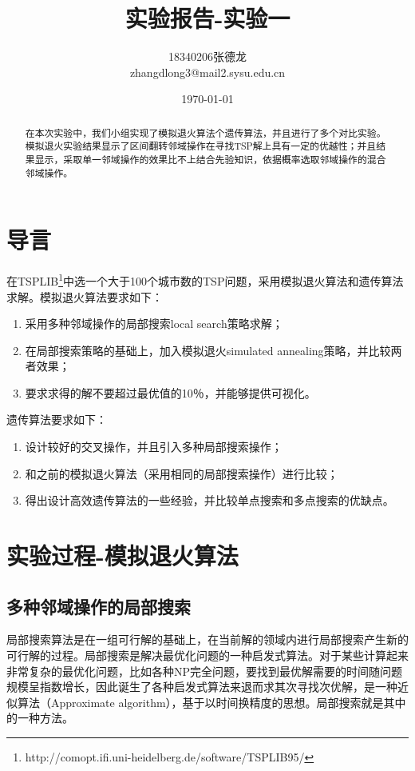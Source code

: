 \documentclass[withoutpreface,bwprint]{cumcmthesis} %
\title{实验报告-实验一}
\author{18340206张德龙 \\
	zhangdlong3@mail2.sysu.edu.cn
}
\date{\today}
\begin{document}
\maketitle
\begin{abstract}
 
 在本次实验中，我们小组实现了模拟退火算法个遗传算法，并且进行了多个对比实验。模拟退火实验结果显示了区间翻转邻域操作在寻找TSP解上具有一定的优越性；并且结果显示，采取单一邻域操作的效果比不上结合先验知识，依据概率选取邻域操作的混合邻域操作。 %
\end{abstract}

\section{导言}

在TSPLIB\footnote{http://comopt.ifi.uni-heidelberg.de/software/TSPLIB95/}中选一个大于100个城市数的TSP问题，采用模拟退火算法和遗传算法求解。模拟退火算法要求如下：
\begin{enumerate}
\item 采用多种邻域操作的局部搜索local search策略求解；
\item 在局部搜索策略的基础上，加入模拟退火simulated annealing策略，并比较两者效果；
\item 要求求得的解不要超过最优值的10％，并能够提供可视化。
\end{enumerate}


遗传算法要求如下：
\begin{enumerate}
\item 设计较好的交叉操作，并且引入多种局部搜索操作；
\item 和之前的模拟退火算法（采用相同的局部搜索操作）进行比较；
\item 得出设计高效遗传算法的一些经验，并比较单点搜索和多点搜索的优缺点。
\end{enumerate}
	

\section{实验过程-模拟退火算法}

\subsection{多种邻域操作的局部搜索}
局部搜索算法是在一组可行解的基础上，在当前解的领域内进行局部搜索产生新的可行解的过程。局部搜索是解决最优化问题的一种启发式算法。对于某些计算起来非常复杂的最优化问题，比如各种NP完全问题，要找到最优解需要的时间随问题规模呈指数增长，因此诞生了各种启发式算法来退而求其次寻找次优解，是一种近似算法（Approximate  algorithm），基于以时间换精度的思想。局部搜索就是其中的一种方法。
\end{document}
